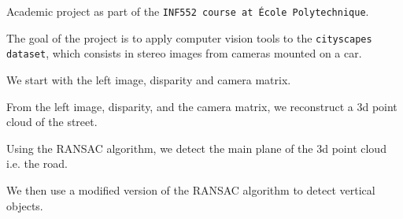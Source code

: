 Academic project as part of the {\tt I\+N\+F552 course at École Polytechnique}.

The goal of the project is to apply computer vision tools to the {\tt cityscapes dataset}, which consists in stereo images from cameras mounted on a car.

We start with the left image, disparity and camera matrix.





From the left image, disparity, and the camera matrix, we reconstruct a 3d point cloud of the street.



Using the R\+A\+N\+S\+AC algorithm, we detect the main plane of the 3d point cloud i.\+e. the road.



We then use a modified version of the R\+A\+N\+S\+AC algorithm to detect vertical objects.

 